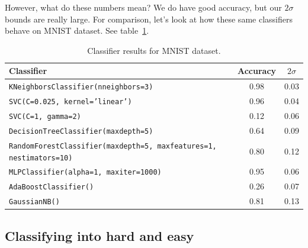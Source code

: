 \documentclass[10pt]{article}
\begin{document}
However, what do these numbers mean? We do have good accuracy, but our
$2\sigma$ bounds are really large. For comparison, let's look at how these same
classifiers behave on MNIST dataset. See table~\ref{tab:MNIST}.

\begin{table}
\begin{center}
\renewcommand{\arraystretch}{1.2}
\begin{tabular}{ l  c  c }
 \label{tab:MNIST}
 Classifier & Accuracy & $2\sigma$ \\
 \hline
  \texttt{KNeighborsClassifier(nneighbors=3)} & 0.98 & 0.03 \\
  \texttt{SVC(C=0.025, kernel='linear')} & 0.96  & 0.04 \\
  \texttt{SVC(C=1, gamma=2)} & 0.12 & 0.06 \\
  \texttt{DecisionTreeClassifier(maxdepth=5)} & 0.64 & 0.09 \\
  \texttt{RandomForestClassifier(maxdepth=5, maxfeatures=1, nestimators=10)} & 0.80 & 0.12 \\
  \texttt{MLPClassifier(alpha=1, maxiter=1000)} & 0.95 & 0.06 \\
  \texttt{AdaBoostClassifier()} & 0.26 & 0.07 \\
  \texttt{GaussianNB()} & 0.81 & 0.13
\end{tabular}
\caption{Classifier results for MNIST dataset.}
\end{center}
\end{table}


\subsection{Classifying into hard and easy}
\end{document}
